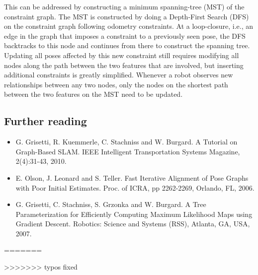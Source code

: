 \documentclass[paper=6.14in:9.21in,pagesize=pdftex,11pt,twoside,openright]{scrbook}
\begin{document}
This can be addressed by constructing a  minimum spanning-tree  (MST) of the constraint graph. The MST is constructed by doing a Depth-First Search (DFS) on the constraint graph following odometry constraints. At a loop-closure, i.e., an edge in the graph that imposes a constraint to a previously seen pose, the DFS backtracks to this node and continues from there to construct the spanning tree. Updating all poses affected by this new constraint still requires modifying all nodes along the path between the two features that are involved, but inserting additional constraints is greatly simplified. Whenever a robot observes new relationships between any two nodes, only the nodes on the shortest path between  the two features on the MST need to be updated. %
\subsection*{Further reading}
\begin{itemize}
\item G. Grisetti, R. Kuemmerle, C. Stachniss and W. Burgard. A Tutorial on Graph-Based SLAM. IEEE Intelligent Transportation Systems Magazine, 2(4):31-43, 2010.

\item E. Olson, J. Leonard and S. Teller. Fast Iterative Alignment of Pose Graphs with Poor Initial Estimates. Proc. of ICRA, pp 2262-2269, Orlando, FL, 2006.

\item G. Grisetti, C. Stachniss, S. Grzonka and W. Burgard. A Tree Parameterization for Efficiently Computing Maximum Likelihood Maps using Gradient Descent. Robotics: Science and Systems (RSS), Atlanta, GA, USA, 2007.
\end{itemize}
=======

%










>>>>>>> typos fixed
\end{document}
